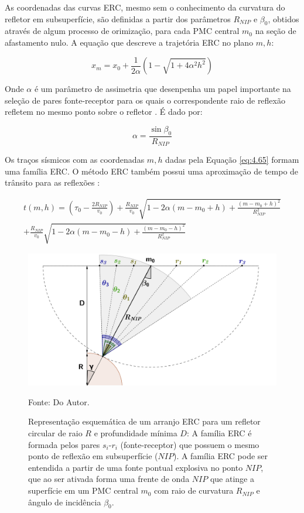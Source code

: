 As coordenadas das curvas ERC, mesmo sem o conhecimento da curvatura do refletor em subsuperfície, são definidas
a partir dos parâmetros $R_{NIP}$ e $\beta_0$, obtidos através de algum processo de orimização, 
para cada PMC central $m_0$ na seção de afastamento nulo. A equação que descreve a trajetória ERC no plano $m,h$:

\begin{equation}
 \label{eq:4.65}
 x_m= x_0 + \frac{1}{2\alpha} (1-\sqrt{1+4\alpha^2h^2})
\end{equation}


Onde $\alpha$ é um parâmetro de assimetria que desenpenha um papel importante na seleção de pares fonte-receptor para os quais
o correspondente raio de reflexão refletem no mesmo ponto sobre o refletor \cite{tygel}. É dado por:

\begin{equation}
\label{eq:4.67}
 \alpha=\frac{\sin{\beta_0}}{R_{NIP}}
\end{equation}

Os traços sísmicos com as coordenadas $m,h$ dadas pela Equação \ref{eq:4.65} formam uma família ERC.
O método ERC também possui uma aproximação de tempo de trânsito para
as reflexões \cite{cre}:

\begin{multline}
\label{eq:4.66}
t(m,h)=(\tau_0-\frac{2R_{NIP}}{v_0})+\frac{R_{NIP}}{v_0}\sqrt{1-2\alpha(m-m_0+h)+\frac{(m-m_0+h)^2}{R_{NIP}^2}} \\
+\frac{R_{NIP}}{v_0}\sqrt{1-2\alpha(m-m_0-h)+\frac{(m-m_0-h)^2}{R_{NIP}^2}}
\end{multline}

\begin{figure}[H]
\caption{Representação esquemática de um arranjo ERC para um refletor circular de raio $R$ e profundidade
mínima $D$: A família ERC é formada pelos pares $s_i$-$r_i$ (fonte-receptor) que possuem o mesmo ponto de
reflexão em subsuperfície ($NIP$). A família ERC pode ser entendida a partir de uma fonte pontual explosiva
no ponto $NIP$, que ao ser ativada forma uma frente de onda $NIP$ que atinge a superfície em um PMC central 
$m_0$ com raio de curvatura $R_{NIP}$ e ângulo de incidência $\beta_0$.}
\begin{center}
\includegraphics[scale=0.3]{images/cre.png}
\vspace{-0.3cm}
\end{center}
\begin{center}
 Fonte: Do Autor.
\end{center}
\label{fig:4.1}
\end{figure}

